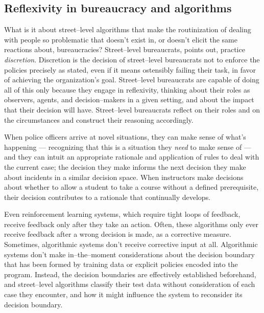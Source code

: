 \documentclass[street-level_algorithms]{subfiles}
\begin{document}
\subsection{Reflexivity in bureaucracy and algorithms}

What is it about street--level algorithms that make the routinization of dealing with people so problematic
that doesn't exist in, or doesn't elicit the same reactions about, bureaucracies?
Street--level bureaucrats, \citeauthor{lipsky1983street} points out,
practice \textit{discretion}.
Discretion is the decision of street--level bureaucrats
not to enforce the policies precisely as stated,
even if it means ostensibly failing their task,
in favor of achieving the organization's goal.
Street--level bureaucrats are capable of doing all of this only because they engage in reflexivity,
thinking about their roles as
observers, agents, and decision--makers in a given setting, and
about the impact that their decision will have.
Street--level bureaucrats reflect on their roles and on the circumstances and construct their reasoning accordingly.

{}
When police officers arrive at novel situations, they can make sense of what's happening
--- recognizing that this is a situation they \textit{need} to make sense of ---
{and they can intuit an appropriate rationale and application of rules to deal with the current case;}
the decision they make informs the next decision they make about incidents in a similar decision space.
When instructors make decisions about whether to allow a student to take a course without a defined prerequisite,
their decision contributes to a rationale that continually develops.

{}
Even reinforcement learning systems, which require tight loops of feedback,
receive feedback only after they take an action.
Often, these algorithms only ever receive feedback after a wrong decision is made, as a corrective measure.
{Sometimes, algorithmic systems don't receive corrective input at all.}
Algorithmic systems don't make in--the--moment considerations about
the decision boundary that has been formed by training data or explicit policies encoded into the program.
{Instead, the decision boundaries are effectively established beforehand,
and street--level algorithms classify their test data without consideration of each case they encounter,
and how it might influence the system to reconsider its decision boundary.}
\end{document}
